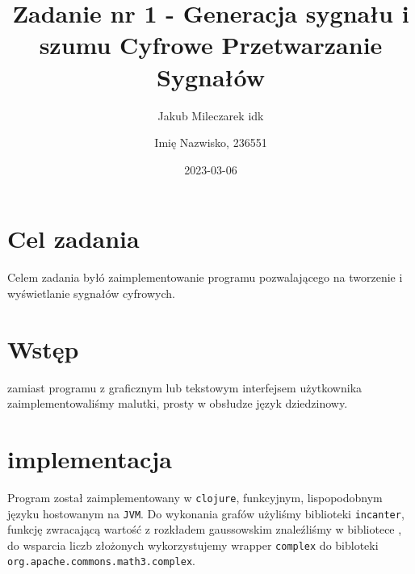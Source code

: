 \documentclass[12pt]{article}
\title{{\bf Zadanie nr 1 - Generacja sygnału i szumu}\linebreak
	Cyfrowe Przetwarzanie Sygnałów}
\author{Jakub Mileczarek idk \and Imię Nazwisko, 236551}
\date{2023-03-06} %
\newcommand{\BibTeX}{{\sc Bib}\TeX}
\begin{document}
\clearpage\maketitle
\thispagestyle{empty}
\newpage
\setcounter{page}{1}
\section{Cel zadania}
Celem zadania byłó zaimplementowanie programu pozwalającego na tworzenie i wyświetlanie sygnałów cyfrowych.




\section{Wstęp}
zamiast programu z graficznym lub tekstowym interfejsem użytkownika zaimplementowaliśmy malutki, prosty w obsłudze język dziedzinowy.

\section{implementacja}
Program został zaimplementowany w \texttt{clojure}, funkcyjnym, lispopodobnym języku hostowanym na \texttt{JVM}. Do wykonania grafów użyliśmy biblioteki \texttt{incanter}, funkcję zwracającą wartość z rozkładem gaussowskim znaleźliśmy w bibliotece , do wsparcia liczb złożonych wykorzystujemy wrapper \texttt{complex} do bibloteki \texttt{org.apache.commons.math3.complex}.
\end{document}
